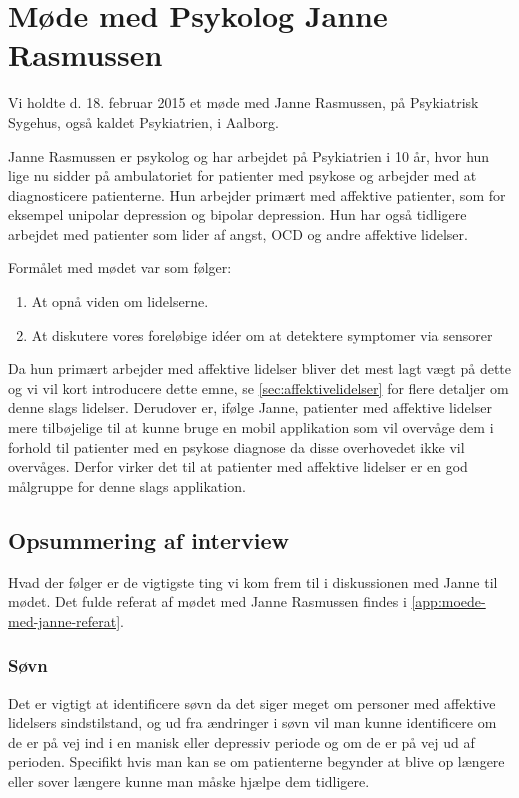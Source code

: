\section{Møde med Psykolog Janne Rasmussen}\label{sec:moede-med-psykolog}
Vi holdte d. 18. februar 2015 et møde med Janne Rasmussen, på Psykiatrisk Sygehus, også kaldet Psykiatrien, i Aalborg.

Janne Rasmussen er psykolog og har arbejdet på Psykiatrien i 10 år, hvor hun lige nu sidder på ambulatoriet for patienter med psykose og arbejder med at diagnosticere patienterne. 
Hun arbejder primært med affektive patienter, som for eksempel unipolar depression og bipolar depression.
Hun har også tidligere arbejdet med patienter som lider af angst, OCD og andre affektive lidelser.

Formålet med mødet var som følger:

\begin{enumerate}
\item At opnå viden om lidelserne.
\item At diskutere vores foreløbige idéer om at detektere symptomer via sensorer
\end{enumerate}

Da hun primært arbejder med affektive lidelser bliver det mest lagt vægt på dette og vi vil kort introducere dette emne, se \cref{sec:affektivelidelser} for flere detaljer om denne slags lidelser.
Derudover er, ifølge Janne, patienter med affektive lidelser mere tilbøjelige til at kunne bruge en mobil applikation som vil overvåge dem i forhold til patienter med en psykose diagnose da disse overhovedet ikke vil overvåges.
Derfor virker det til at patienter med affektive lidelser er en god målgruppe for denne slags applikation.

\subsection{Opsummering af interview}
Hvad der følger er de vigtigste ting vi kom frem til i diskussionen med Janne til mødet.
Det fulde referat af mødet med Janne Rasmussen findes i \cref{app:moede-med-janne-referat}.

\subsubsection{Søvn}
Det er vigtigt at identificere søvn da det siger meget om personer med affektive lidelsers sindstilstand, og ud fra ændringer i søvn vil man kunne identificere om de er på vej ind i en manisk eller depressiv periode og om de er på vej ud af perioden. 
Specifikt hvis man kan se om patienterne begynder at blive op længere eller sover længere kunne man måske hjælpe dem tidligere.

